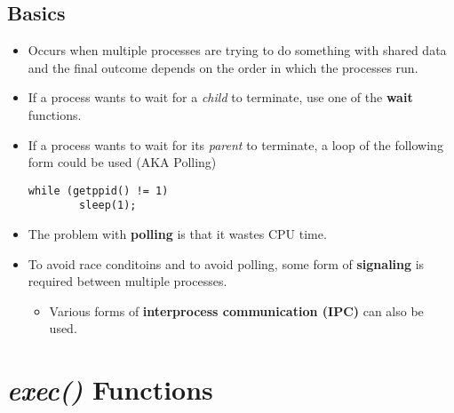 \documentclass{article}
\newcommand\be[1]{\textbf{\emph{#1}}}
\begin{document}
\subsection{Basics}
\begin{itemize}
    \item Occurs when multiple processes are trying to do something with shared data
        and the final outcome depends on the order in which the processes run.
    \item If a process wants to wait for a \emph{child} to terminate, use one of the \textbf{wait} functions.
    \item If a process wants to wait for its \emph{parent} to terminate, a loop of the following form could
        be used (AKA Polling)
        \begin{lstlisting}[frame = single, caption = {Example of Polling}]
    while (getppid() != 1)
        sleep(1);
    \end{lstlisting}
\item The problem with \textbf{polling} is that it wastes CPU time.
\item To avoid race conditoins and to avoid polling, some form of \textbf{signaling} is required
    between multiple processes.
        \begin{itemize}
            \item Various forms of \textbf{interprocess communication (IPC)} can also be used.
        \end{itemize}

\end{itemize}

\section{\be{exec()} Functions}
\end{document}
